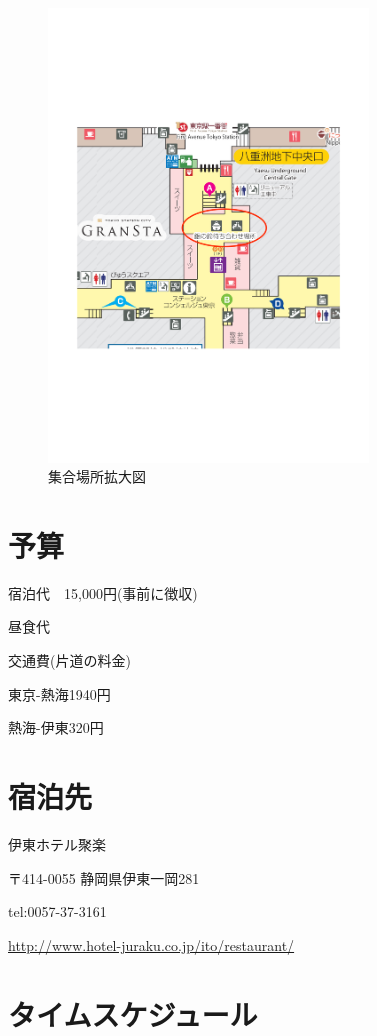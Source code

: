 \documentclass[a4j,11pt]{jsarticle}
\begin{document}
\begin{figure}[H]
\begin{center}
\includegraphics[mediaboxonly=/CropBox,width=85mm]{syuugoukakudai.pdf}
\end{center}
\caption{集合場所拡大図}
\label{fig:2}
\end{figure}

\section{予算} 
\label{sec:end} 
宿泊代　15,000円(事前に徴収)

昼食代

交通費(片道の料金)

東京-熱海1940円

熱海-伊東320円

\section{宿泊先}
伊東ホテル聚楽

〒414-0055
静岡県伊東一岡281


tel:0057-37-3161

\url{http://www.hotel-juraku.co.jp/ito/restaurant/}
\section{タイムスケジュール}
\end{document}
